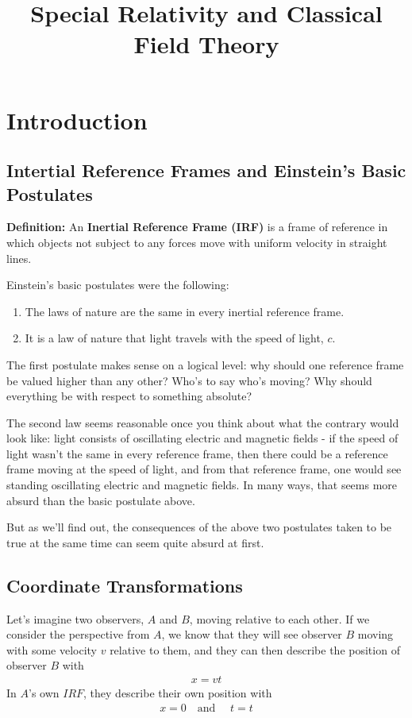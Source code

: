 \documentclass[a4paper]{article}
\title{Special Relativity and Classical Field Theory}
\begin{document}
    \maketitle
    \tableofcontents
    \newpage

    \section{Introduction}
    \subsection{Intertial Reference Frames and Einstein's Basic Postulates}
    \textbf{Definition:} An \textbf{Inertial Reference Frame (IRF)} is a frame of reference in which objects not subject to any forces move with uniform velocity in straight lines. 
    
    Einstein's basic postulates were the following: \begin{enumerate}
        \item The laws of nature are the same in every inertial reference frame.
        \item It is a law of nature that light travels with the speed of light, \(c\). 
    \end{enumerate}

    The first postulate makes sense on a logical level: why should one reference frame be valued higher than any other? Who's to say who's moving? Why should everything be with respect to something absolute?
    
    The second law seems reasonable once you think about what the contrary would look like: light consists of oscillating electric and magnetic fields - if the speed of light wasn't the same in every reference frame, then there could be a reference frame moving at the speed of light, and from that reference frame, one would see standing oscillating electric and magnetic fields. In many ways, that seems more absurd than the basic postulate above.

    But as we'll find out, the consequences of the above two postulates taken to be true at the same time can seem quite absurd at first.

    \subsection{Coordinate Transformations}
    Let's imagine two observers, \(A\) and \(B\), moving relative to each other. If we consider the perspective from \(A\), we know that they will see observer \(B\) moving with some velocity \(v\) relative to them, and they can then describe the position of observer \(B\) with \begin{align*}
        x = vt
    \end{align*}
    In \(A\)'s own \(IRF\), they describe their own position with \begin{align*}
        x = 0\quad \text{and }\quad t = t
    \end{align*}
\end{document}
